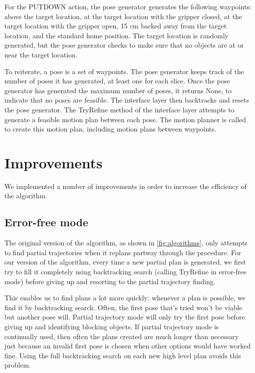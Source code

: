 \documentclass[12pt]{article}
\begin{document}
For the PUTDOWN action, the pose generator generates the following waypoints: above the target location, at the target location with the gripper closed, at the target location with the gripper open, 15 cm backed away from the target location, and the standard home position. 
The target location is randomly generated, but the pose generator checks to make sure that no objects are at or near the target location.

To reiterate, a pose is a set of waypoints. 
The pose generator keeps track of the number of poses it has generated, at least one for each slice. 
Once the pose generator has generated the maximum number of poses, it returns None, to indicate that no poses are feasible. 
The interface layer then backtracks and resets the pose generator. 
The TryRefine method of the interface layer attempts to generate a feasible motion plan between each pose.  
The motion planner is called to create this motion plan, including motion plans between waypoints.

\section{Improvements}

We implemented a number of improvements in order to increase the efficiency of the algorithm.

\subsection{Error-free mode}

The original version of the algorithm, as shown in \ref{fig:algorithms}, only attempts to find partial trajectories when it replans partway through the procedure.  
For our version of the algorithm, every time a new partial plan is generated, we first try to fill it completely using backtracking search (calling TryRefine in error-free mode) before giving up and resorting to the partial trajectory finding. 

This enables us to find plans a lot more quickly: whenever a plan is possible, we find it by backtracking search.  
Often, the first pose that's tried won't be viable but another pose will.  
Partial trajectory mode will only try the first pose before giving up and identifying blocking objects.
If partial trajectory mode is continually used, then often the plans created are much longer than necessary just because an invalid first pose is chosen when other options would have worked fine.
Using the full backtracking search on each new high level plan avoids this problem.
\end{document}
